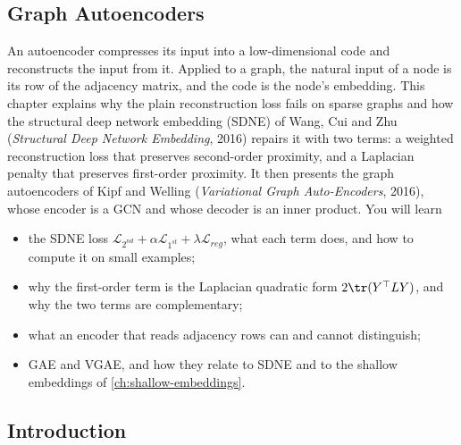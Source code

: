 \begin{notechapter}
\forgetcs\hadamard\newcommand{\hadamard}{\odot}
\chapter{Graph Autoencoders}\label{ch:graph-autoencoders}

\begin{chapterintro}
An autoencoder compresses its input into a low-dimensional code and reconstructs the input from it. Applied to a graph, the natural input of a node is its row of the adjacency matrix, and the code is the node's embedding. This chapter explains why the plain reconstruction loss fails on sparse graphs and how the structural deep network embedding (SDNE) of Wang, Cui and Zhu (\emph{Structural Deep Network Embedding}, 2016) repairs it with two terms: a weighted reconstruction loss that preserves second-order proximity, and a Laplacian penalty that preserves first-order proximity. It then presents the graph autoencoders of Kipf and Welling (\emph{Variational Graph Auto-Encoders}, 2016), whose encoder is a GCN and whose decoder is an inner product. You will learn
\begin{itemize}[nosep]
  \item the SDNE loss $\mathcal L_{2^{nd}} + \alpha\mathcal L_{1^{st}} + \lambda\mathcal L_{reg}$, what each term does, and how to compute it on small examples;
  \item why the first-order term is the Laplacian quadratic form $2\tr(Y^\top LY)$, and why the two terms are complementary;
  \item what an encoder that reads adjacency rows can and cannot distinguish;
  \item GAE and VGAE, and how they relate to SDNE and to the shallow embeddings of \cref{ch:shallow-embeddings}.
\end{itemize}
\end{chapterintro}

\section{Introduction}


\end{notechapter}
